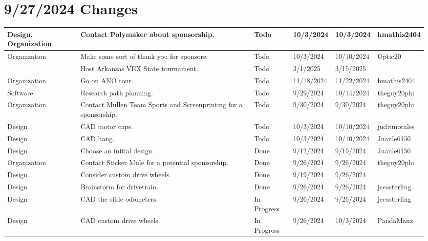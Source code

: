 \section{9/27/2024 Changes}
\begin{center}
\begin{longtable}{| p{40pt} | p{150pt} | p{35pt} | p{33pt} | p{33pt} | p{40pt} |}
\hline \rowcolor{IndianRed1}
Design, Organization & Contact Polymaker about sponsorship. & Todo & 10/3/2024 & 10/3/2024 & hmathis2404 \\
\hline \rowcolor{IndianRed1}
Organization & Make some sort of thank you for sponsors. & Todo & 10/3/2024 & 10/10/2024 & Optic20 \\
\hline \rowcolor{IndianRed1}
& Host Arkansas VEX State tournament. & Todo & 3/1/2025 & 3/15/2025 & \\
\hline \rowcolor{IndianRed1}
Organization & Go on ANO tour. & Todo & 11/18/2024 & 11/22/2024 & hmathis2404 \\
\hline \rowcolor{IndianRed1}
Software & Research path planning. & Todo & 9/29/2024 & 10/14/2024 & theguy20phi \\
\hline \rowcolor{IndianRed1}
Organization & Contact Mullen Team Sports and Screenprinting for a sponsorship. & Todo & 9/30/2024 & 9/30/2024 & theguy20phi \\
\hline \rowcolor{IndianRed1}
Design & CAD motor caps. & Todo & 10/3/2024 & 10/10/2024 & juditmorales \\
\hline \rowcolor{IndianRed1}
Design & CAD hang. & Todo & 10/3/2024 & 10/10/2024 & Juanle6150 \\
\hline \rowcolor{DarkSeaGreen1}
Design & Choose an initial design. & Done & 9/12/2024 & 9/19/2024 & Juanle6150 \\
\hline \rowcolor{DarkSeaGreen1}
Organization & Contact Sticker Mule for a potential sponsorship. & Done & 9/26/2024 & 9/26/2024 & theguy20phi \\
\hline \rowcolor{DarkSeaGreen1}
Design & Consider custom drive wheels. & Done & 9/19/2024 & 9/26/2024 & \\
\hline \rowcolor{DarkSeaGreen1}
Design & Brainstorm for drivetrain. & Done & 9/26/2024 & 9/26/2024 & jceasterling \\
\hline \rowcolor{LightGoldenrod1}
Design & CAD the slide odometers. & In Progress & 9/26/2024 & 9/26/2024 & jceasterling \\
\hline \rowcolor{LightGoldenrod1}
Design & CAD custom drive wheels. & In Progress & 9/26/2024 & 10/3/2024 & PandaManz \\

\end{longtable}
\end{center}
